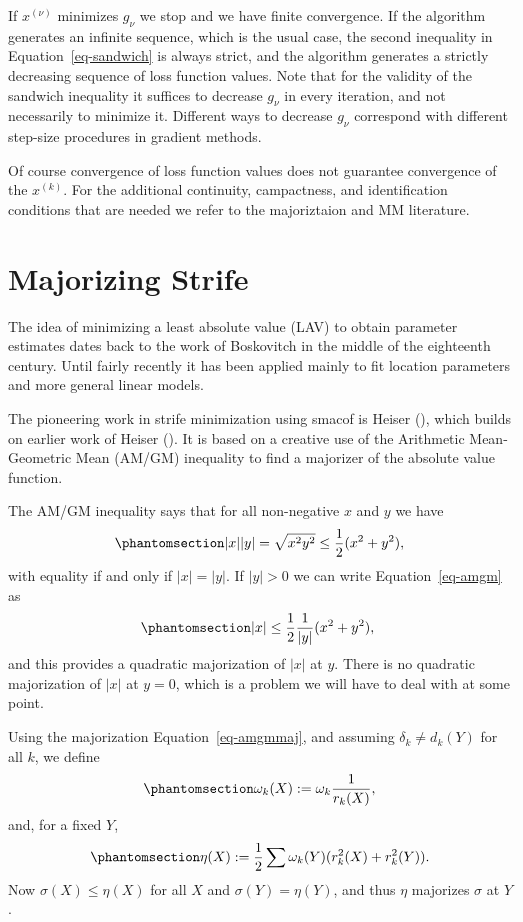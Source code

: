 \documentclass[
  12pt,
  letterpaper,
  DIV=11,
  numbers=noendperiod]{scrartcl}
\theoremstyle{plain}
\theoremstyle{plain}
\theoremstyle{plain}
\theoremstyle{definition}
\theoremstyle{definition}
\theoremstyle{remark}
\begin{document}
If \(x^{(\nu)}\) minimizes \(g_\nu\) we stop and we have finite
convergence. If the algorithm generates an infinite sequence, which is
the usual case, the second inequality in Equation~\ref{eq-sandwich} is
always strict, and the algorithm generates a strictly decreasing
sequence of loss function values. Note that for the validity of the
sandwich inequality it suffices to decrease \(g_\nu\) in every
iteration, and not necessarily to minimize it. Different ways to
decrease \(g_\nu\) correspond with different step-size procedures in
gradient methods.

Of course convergence of loss function values does not guarantee
convergence of the \(x^{(k)}\). For the additional continuity,
campactness, and identification conditions that are needed we refer to
the majoriztaion and MM literature.

\section{Majorizing Strife}\label{sec-majorization}

The idea of minimizing a least absolute value (LAV) to obtain parameter
estimates dates back to the work of Boskovitch in the middle of the
eighteenth century. Until fairly recently it has been applied mainly to
fit location parameters and more general linear models.

The pioneering work in strife minimization using smacof is Heiser
(), which builds on earlier work of Heiser
(). It is based on a creative use of the
Arithmetic Mean-Geometric Mean (AM/GM) inequality to find a majorizer of
the absolute value function.

The AM/GM inequality says that for all non-negative \(x\) and \(y\) we
have \begin{equation}\phantomsection\label{eq-amgm}{
|x||y|=\sqrt{x^2y^2}\leq\frac12(x^2+y^2),
}\end{equation} with equality if and only if \(|x|=|y|\). If \(|y|>0\)
we can write Equation~\ref{eq-amgm} as
\begin{equation}\phantomsection\label{eq-amgmmaj}{
|x|\leq\frac12\frac{1}{|y|}(x^2+y^2),\
}\end{equation} and this provides a quadratic majorization of \(|x|\) at
\(y\). There is no quadratic majorization of \(|x|\) at \(y=0\), which
is a problem we will have to deal with at some point.

Using the majorization Equation~\ref{eq-amgmmaj}, and assuming
\(\delta_k\not=d_k(Y)\) for all \(k\), we define
\begin{equation}\phantomsection\label{eq-wk1def}{
\omega_k(X):=\omega_k\frac{1}{r_k(X)},
}\end{equation} and, for a fixed \(Y\),
\begin{equation}\phantomsection\label{eq-strifemaj}{
\eta(X):=\frac12\sum \omega_k(Y)(r_k^2(X)+r_k^2(Y)).
}\end{equation} Now \(\sigma(X)\leq\eta(X)\) for all \(X\) and
\(\sigma(Y)=\eta(Y)\), and thus \(\eta\) majorizes \(\sigma\) at \(Y\).
\end{document}
